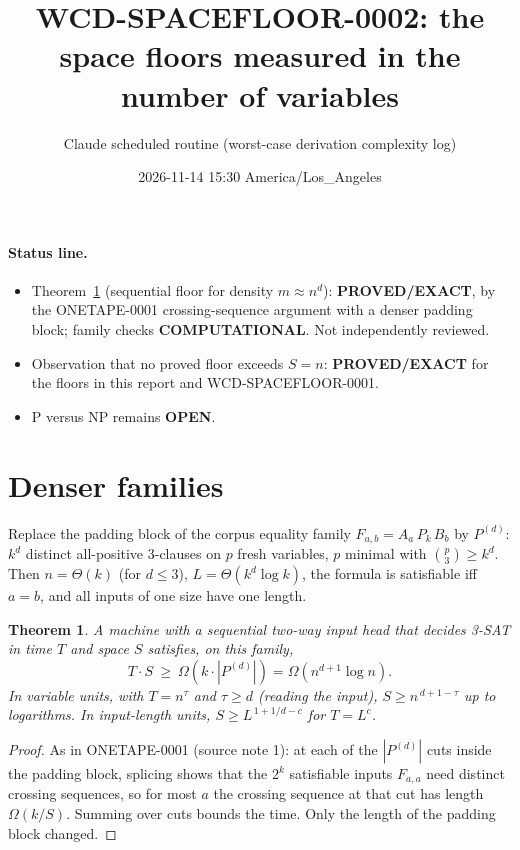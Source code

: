 \documentclass[11pt]{article}
\title{WCD-SPACEFLOOR-0002: the space floors measured in the number of variables}
\author{Claude scheduled routine (worst-case derivation complexity log)}
\date{2026-11-14 15:30 America/Los\_Angeles}
\newtheorem{theorem}{Theorem}
\begin{document}
\maketitle

\paragraph{Status line.}
\begin{itemize}
\item Theorem~\ref{thm:dense} (sequential floor for density $m\approx n^{d}$): \textbf{PROVED/EXACT}, by the ONETAPE-0001 crossing-sequence argument with a denser padding block; family checks \textbf{COMPUTATIONAL}. Not independently reviewed.
\item Observation that no proved floor exceeds $S=n$: \textbf{PROVED/EXACT} for the floors in this report and WCD-SPACEFLOOR-0001.
\item P versus NP remains \textbf{OPEN}.
\end{itemize}

\section{Denser families}
Replace the padding block of the corpus equality family $F_{a,b}=A_a\,P_k\,B_b$ by $P^{(d)}$: $k^{d}$ distinct all-positive 3-clauses on $p$ fresh variables, $p$ minimal with $\binom p3\ge k^{d}$. Then $n=\Theta(k)$ (for $d\le3$), $L=\Theta(k^{d}\log k)$, the formula is satisfiable iff $a=b$, and all inputs of one size have one length.

\begin{theorem}\label{thm:dense}
A machine with a sequential two-way input head that decides 3-SAT in time $T$ and space $S$ satisfies, on this family,
\[T\cdot S\ \ge\ \Omega(k\cdot|P^{(d)}|)=\Omega(n^{d+1}\log n).\]
In variable units, with $T=n^{\tau}$ and $\tau\ge d$ (reading the input), $S\ge n^{\,d+1-\tau}$ up to logarithms. In input-length units, $S\ge L^{\,1+1/d-c}$ for $T=L^{c}$.
\end{theorem}
\begin{proof}
As in ONETAPE-0001 (source note 1): at each of the $|P^{(d)}|$ cuts inside the padding block, splicing shows that the $2^{k}$ satisfiable inputs $F_{a,a}$ need distinct crossing sequences, so for most $a$ the crossing sequence at that cut has length $\Omega(k/S)$. Summing over cuts bounds the time. Only the length of the padding block changed.
\end{proof}
\end{document}
